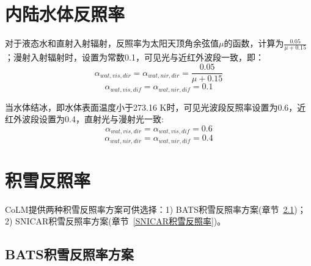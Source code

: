 \section{内陆水体反照率}
对于液态水和直射入射辐射，反照率为太阳天顶角余弦值$\mu$的函数，计算为$\frac{0.05}{\mu+0.15}$；漫射入射辐射时，设置为常数0.1，可见光与近红外波段一致，即：
%
\begin{equation}
\alpha_{wat,vis,dir}=\alpha_{wat,nir,dir}= \frac {0.05}{\mu+0.15}
\end{equation}
%
\begin{equation}
\alpha_{wat,vis,dif}=\alpha_{wat,nir,dif}=0.1
\end{equation}

当水体结冰，即水体表面温度小于273.16 K时，可见光波段反照率设置为0.6，近红外波段设置为0.4，直射光与漫射光一致:
%
\begin{equation}
\alpha_{wat,vis,dir}=\alpha_{wat,vis,dif}=0.6
\end{equation}
%
\begin{equation}
\alpha_{wat,nir,dir}=\alpha_{wat,nir,dif}=0.4
\end{equation}

\section{积雪反照率}

CoLM提供两种积雪反照率方案可供选择：1) BATS积雪反照率方案(章节~\ref{BATS积雪反照率})；2) SNICAR积雪反照率方案(章节~\ref{SNICAR积雪反照率})。

\subsection{BATS积雪反照率方案}\label{BATS积雪反照率}

